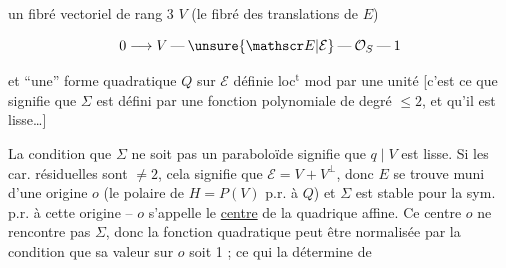 
un fibré vectoriel de rang 3 $V$ (le fibré des translations de $E$)

\[
0\longrightarrow V\mathbin{\text{---}}\unsure{\mathscr E|\mathcal E}\mathbin{\text{---}}\mathcal O_S\mathbin{\text{---}}1
\]

et ``une'' forme quadratique $Q$  sur $\mathscr E$ définie loc$^{\mathrm t}$ mod  par une unité [c'est ce que signifie que $\Sigma$ est défini par une fonction polynomiale de degré $\leq2$, et qu'il est  lisse\ldots]

La condition que $\Sigma$ ne soit pas un paraboloïde signifie que $q\mid V$ est  lisse. Si les car. résiduelles sont $\ne2$, cela signifie  que $\mathscr E=V+V^\perp$, donc $E$ se trouve muni d'une origine $o$  (le polaire de $H=P(V)$ p.r. à  $Q$) et $\Sigma$ est stable pour la sym. p.r. à cette origine -- $o$ s'appelle le \uline{centre} de la quadrique affine. Ce centre $o$  ne rencontre pas $\Sigma$, donc la fonction quadratique peut être normalisée  par la condition que sa valeur sur $o$ soit 1 ; ce qui la détermine de

